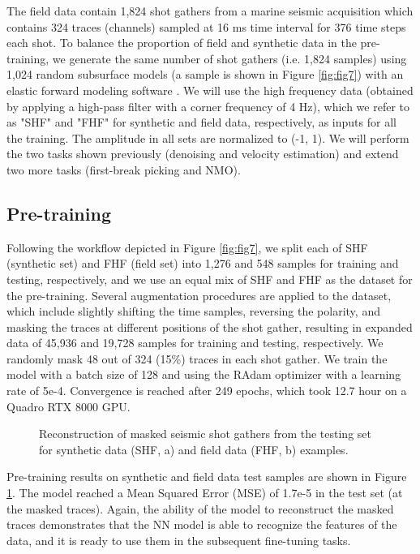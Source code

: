 \documentclass{article}
\begin{document}
The field data contain 1,824 shot gathers from a marine seismic acquisition which contains 324 traces (channels) sampled at 16 ms time interval for 376 time steps each shot. To balance the proportion of field and synthetic data in the pre-training, we generate the same number of shot gathers (i.e. 1,824 samples) using 1,024 random subsurface models (a sample is shown in Figure \ref{fig:fig7}) with an elastic forward modeling software \cite{kohn2011time}. We will use the high frequency data (obtained by applying a high-pass filter with a corner frequency of 4 Hz), which we refer to as "SHF" and "FHF" for synthetic and field data, respectively, as inputs for all the training. The amplitude in all sets are normalized to (-1, 1).
We will perform the two tasks shown previously (denoising and velocity estimation) and extend two more tasks (first-break picking and NMO).

\subsection{Pre-training}
\label{sec:pretrain_field}
Following the workflow depicted in Figure \ref{fig:fig7}, we split each of SHF (synthetic set) and FHF (field set) into 1,276 and 548 samples for training and testing, respectively, and we use an equal mix of SHF and FHF as the dataset for the pre-training. Several augmentation procedures are applied to the dataset, which include slightly shifting the time samples, reversing the polarity, and masking the traces at different positions of the shot gather, resulting in expanded data of 45,936 and 19,728 samples for training and testing, respectively. We randomly mask 48 out of 324 (15\%) traces in each shot gather. We train the model with a batch size of 128 and using the RAdam optimizer with a learning rate of 5e-4. Convergence is reached after 249 epochs, which took 12.7 hour on a Quadro RTX 8000 GPU.

\begin{figure}[h]
    \hspace{1.3cm}
    \newline
    \centering
    \caption{Reconstruction of masked seismic shot gathers from the testing set for synthetic data (SHF, a) and field data (FHF, b) examples.}
    \label{fig:fig8}
\end{figure}

Pre-training results on synthetic and field data test samples are shown in Figure \ref{fig:fig8}. The model reached a Mean Squared Error (MSE) of 1.7e-5 in the test set (at the masked traces). Again, the ability of the model to reconstruct the masked traces demonstrates that the NN model is able to recognize the features of the data, and it is ready to use them in the subsequent fine-tuning tasks.
\end{document}
